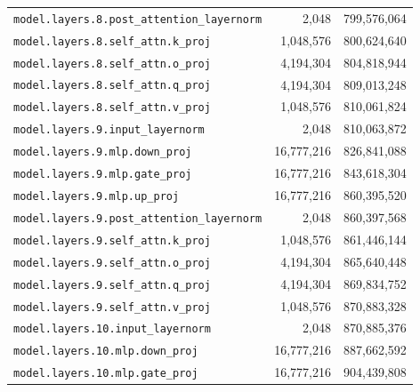 \documentclass[10pt,a4paper]{article}
\begin{document}
\begin{appendices}
\begin{longtable}{p{9.5cm}rr}
\texttt{model.\allowbreak{}layers.\allowbreak{}8.\allowbreak{}post\_attention\_layernorm} & 2,048 & 799,576,064 \\
\texttt{model.\allowbreak{}layers.\allowbreak{}8.\allowbreak{}self\_attn.\allowbreak{}k\_proj} & 1,048,576 & 800,624,640 \\
\texttt{model.\allowbreak{}layers.\allowbreak{}8.\allowbreak{}self\_attn.\allowbreak{}o\_proj} & 4,194,304 & 804,818,944 \\
\texttt{model.\allowbreak{}layers.\allowbreak{}8.\allowbreak{}self\_attn.\allowbreak{}q\_proj} & 4,194,304 & 809,013,248 \\
\texttt{model.\allowbreak{}layers.\allowbreak{}8.\allowbreak{}self\_attn.\allowbreak{}v\_proj} & 1,048,576 & 810,061,824 \\
\texttt{model.\allowbreak{}layers.\allowbreak{}9.\allowbreak{}input\_layernorm} & 2,048 & 810,063,872 \\
\texttt{model.\allowbreak{}layers.\allowbreak{}9.\allowbreak{}mlp.\allowbreak{}down\_proj} & 16,777,216 & 826,841,088 \\
\texttt{model.\allowbreak{}layers.\allowbreak{}9.\allowbreak{}mlp.\allowbreak{}gate\_proj} & 16,777,216 & 843,618,304 \\
\texttt{model.\allowbreak{}layers.\allowbreak{}9.\allowbreak{}mlp.\allowbreak{}up\_proj} & 16,777,216 & 860,395,520 \\
\texttt{model.\allowbreak{}layers.\allowbreak{}9.\allowbreak{}post\_attention\_layernorm} & 2,048 & 860,397,568 \\
\texttt{model.\allowbreak{}layers.\allowbreak{}9.\allowbreak{}self\_attn.\allowbreak{}k\_proj} & 1,048,576 & 861,446,144 \\
\texttt{model.\allowbreak{}layers.\allowbreak{}9.\allowbreak{}self\_attn.\allowbreak{}o\_proj} & 4,194,304 & 865,640,448 \\
\texttt{model.\allowbreak{}layers.\allowbreak{}9.\allowbreak{}self\_attn.\allowbreak{}q\_proj} & 4,194,304 & 869,834,752 \\
\texttt{model.\allowbreak{}layers.\allowbreak{}9.\allowbreak{}self\_attn.\allowbreak{}v\_proj} & 1,048,576 & 870,883,328 \\
\texttt{model.\allowbreak{}layers.\allowbreak{}10.\allowbreak{}input\_layernorm} & 2,048 & 870,885,376 \\
\texttt{model.\allowbreak{}layers.\allowbreak{}10.\allowbreak{}mlp.\allowbreak{}down\_proj} & 16,777,216 & 887,662,592 \\
\texttt{model.\allowbreak{}layers.\allowbreak{}10.\allowbreak{}mlp.\allowbreak{}gate\_proj} & 16,777,216 & 904,439,808 \\

\end{longtable}
\end{appendices}
\end{document}
